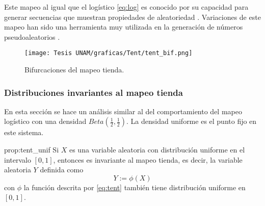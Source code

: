 \documentclass[../Main.tex]{subfiles}
\begin{document}
Este mapeo al igual que el logístico \ref{eq:log} es conocido por su capacidad para generar secuencias que muestran propiedades de aleatoriedad \cite{Schuster2005}. Variaciones de este mapeo han sido una herramienta muy utilizada en la generación de números pseudoaleatorios \cite{Callegari1997}.



\begin{figure}[h!]
    \centering
    \texttt{[image: Tesis UNAM/graficas/Tent/tent\_bif.png]}
    \caption{Bifurcaciones del mapeo tienda.}
    \label{fig:bif-log}
\end{figure} 



\subsubsection{Distribuciones invariantes al mapeo tienda}
En esta sección se hace un análisis similar al del comportamiento del mapeo logístico con una densidad $Beta(\frac{1}{2},\frac{1}{2})$. La densidad uniforme es el punto fijo en este sistema.
\begin{proposition}{}{prop:tent_unif}
Si $X$ es una variable aleatoria con distribución uniforme en el intervalo $[0,1]$, entonces es invariante al mapeo tienda, es decir, la variable aleatoria $Y$ definida como  $$Y:=\phi(X)$$ con $\phi$ la función descrita por \ref{eq:tent} también tiene distribución uniforme en $[0,1]$.
\end{proposition}
\end{document}

